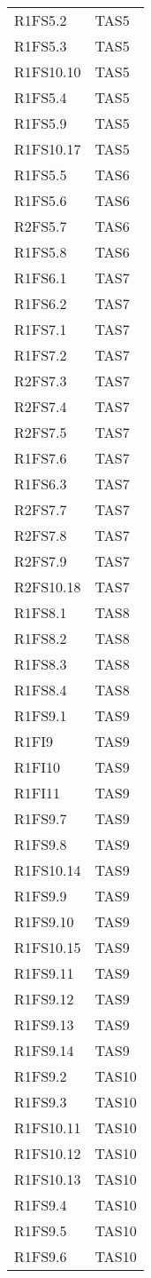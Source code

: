 {\begin{longtable}{C{4cm} C{4cm}}
R1FS5.2 & TAS5 \\
R1FS5.3 & TAS5 \\
R1FS10.10 & TAS5 \\
R1FS5.4 & TAS5 \\
R1FS5.9 & TAS5 \\
R1FS10.17 & TAS5 \\
R1FS5.5 & TAS6 \\
R1FS5.6 & TAS6 \\
R2FS5.7 & TAS6 \\
R1FS5.8 & TAS6 \\
R1FS6.1 & TAS7 \\
R1FS6.2 & TAS7 \\
R1FS7.1 & TAS7 \\
R1FS7.2 & TAS7 \\
R2FS7.3 & TAS7 \\
R2FS7.4 & TAS7 \\
R2FS7.5 & TAS7 \\
R1FS7.6 & TAS7 \\
R1FS6.3 & TAS7 \\
R2FS7.7 & TAS7 \\
R2FS7.8 & TAS7 \\
R2FS7.9 & TAS7 \\
R2FS10.18 & TAS7 \\
R1FS8.1 & TAS8 \\
R1FS8.2 & TAS8 \\
R1FS8.3 & TAS8 \\
R1FS8.4 & TAS8 \\
R1FS9.1 & TAS9 \\
R1FI9 & TAS9 \\
R1FI10 & TAS9 \\
R1FI11 & TAS9 \\
R1FS9.7 & TAS9 \\
R1FS9.8 & TAS9 \\
R1FS10.14 & TAS9 \\
R1FS9.9 & TAS9 \\
R1FS9.10 & TAS9 \\
R1FS10.15 & TAS9 \\
R1FS9.11 & TAS9 \\
R1FS9.12 & TAS9 \\
R1FS9.13 & TAS9 \\
R1FS9.14 & TAS9 \\
R1FS9.2 & TAS10 \\
R1FS9.3 & TAS10 \\
R1FS10.11 & TAS10 \\
R1FS10.12 & TAS10 \\
R1FS10.13 & TAS10 \\
R1FS9.4 & TAS10 \\
R1FS9.5 & TAS10 \\
R1FS9.6 & TAS10 \\

\end{longtable}
}






















